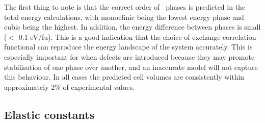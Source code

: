 \begin{table}[ht] %
\onehalfspacing
\centering
\caption[Calculated unit cell parameters for the different crystal structures of \zirconia . Experimental data for pure monoclinic, yttria-stabilised tetragonal and magnesia-stabilised cubic phases at 295 K are shown in parentheses. Energy difference between structures is shown with respect to the cubic phase.]{Calculated unit cell parameters for the different crystal structures of \zirconia . Experimental data for monoclinic, tetragonal and cubic phases at 295 K are shown in parentheses \cite{Howard1988}. Energy difference between structures is shown with respect to the cubic phase.}
\label{lattice_params}
\end{table}

The first thing to note is that the correct order of \zirconia\ phases is predicted in the total energy calculations, with monoclinic being the lowest energy phase and cubic being the highest. In addition, the energy difference between phases is small ($<$ 0.1 eV/fu). This is a good indication that the choice of exchange correlation functional can reproduce the energy landscape of the system accurately. This is especially important for when defects are introduced because they may promote stabilisation of one phase over another, and an inaccurate model will not capture this behaviour. In all cases the predicted cell volumes are consistently within approximately 2\% of experimental values. 

\subsection{Elastic constants} \label{bulk_moduli}

